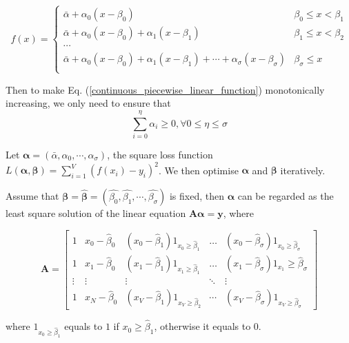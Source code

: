 \begin{equation}
	\label{continuous_piecewise_linear_function}
	f(x)= \begin{cases} 
      \bar{\alpha}+\alpha_0(x-\beta_0) & \beta_0\leq x < \beta_1 \\
      \bar{\alpha}+\alpha_0(x-\beta_0) + \alpha_1(x-\beta_1) &  \beta_1\leq x < \beta_2 \\
      \cdots \\
      \bar{\alpha}+\alpha_0(x-\beta_0) + \alpha_1(x-\beta_1)+\cdots+\alpha_\sigma(x-\beta_\sigma) &  \beta_\sigma\leq x \\
   \end{cases}
\end{equation}


Then to make Eq. (\ref{continuous_piecewise_linear_function}) monotonically increasing, we only need to ensure that $$\sum_{i=0}^\eta \alpha_i\geq 0, \forall 0\leq \eta\leq \sigma$$

Let $\boldsymbol{\alpha}=(\bar{\alpha},\alpha_0,\cdots,\alpha_\sigma)$, the square loss function $L(\boldsymbol{\alpha},\boldsymbol{\beta})=\sum_{i=1}^{V}(f(x_i)-y_i)^2$. We then optimise $\boldsymbol{\alpha}$ and $\boldsymbol{\beta}$ iteratively.

Assume that $\boldsymbol{\beta}=\hat{\boldsymbol{\beta}}=(\hat{\beta_0},\hat{\beta_1},\cdots,\hat{\beta_\sigma})$ is fixed, then $\boldsymbol{\alpha}$ can be regarded as the least square solution of the linear equation $\boldsymbol{A\alpha}=\boldsymbol{y}$, where

$$
\boldsymbol{A}=\left[\begin{array}{ccccc}
1 & x_{0}-\hat{\beta}_{0} & \left(x_{0}-\hat{\beta}_{1}\right) 1_{x_{0} \geq \hat{\beta}_{1}} & \ldots & \left(x_{0}-\hat{\beta}_{\sigma}\right) 1_{x_{0} \geq \hat{\beta}_{\sigma}} \\
1 & x_{1}-\hat{\beta}_{0} & \left(x_{1}-\hat{\beta}_{1}\right) 1_{x_{1} \geq \hat{\beta}_{1}} & \ldots & \left(x_{1}-\hat{\beta}_{\sigma}\right) 1_{x_{1}} \geq \hat{\beta}_{\sigma} \\
\vdots & \vdots & \vdots & \ddots & \vdots \\
1 & x_{N}-\hat{\beta}_{0} & \left(x_{V}-\hat{\beta}_{1}\right) 1_{x_{V} \geq \hat{\beta}_{2}} & \cdots & \left(x_{V}-\hat{\beta}_{\sigma}\right) 1_{x_{V} \geq \hat{\beta}_{\sigma}}
\end{array}\right]$$

where $1_{x_{0} \geq \hat{\beta}_{1}}$ equals to $1$ if ${x_{0} \geq \hat{\beta}_{1}}$, otherwise it equals to $0$.


